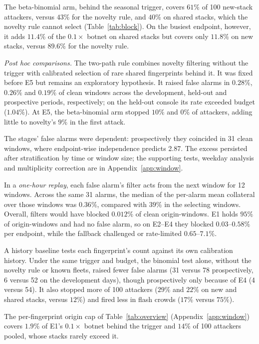 \documentclass[conference,letterpaper,10pt]{IEEEtran}
\newcommand\1{\textit{(i)}}
\newcommand\2{\textit{(ii)}}
\newcommand\3{\textit{(iii)}}
\newcommand\4{\textit{(iv)}}
\newcommand\5{\textit{(v)}}
\newcommand\6{\textit{(vi)}}
\newcommand\7{\textit{(vii)}}
\newcommand\8{\textit{(viii)}}
\newcommand\9{\textit{(ix)}}
\begin{document}
The beta-binomial arm, behind the seasonal trigger, covers $61\%$ of 100 new-stack attackers, versus $43\%$ for the novelty rule, and $40\%$ on shared stacks, which the novelty rule cannot select (Table~\ref{tab:block}). On the busiest endpoint, however, it adds $11.4\%$ of the $0.1\times$ botnet on shared stacks but covers only $11.8\%$ on new stacks, versus $89.6\%$ for the novelty rule.

\textit{Post hoc comparisons.} The two-path rule combines novelty filtering without the trigger with calibrated selection of rare shared fingerprints behind it. It was fixed before E5 but remains an exploratory hypothesis. It raised false alarms in $0.28\%$, $0.26\%$ and $0.19\%$ of clean windows across the development, held-out and prospective periods, respectively; on the held-out console its rate exceeded budget ($1.04\%$). At E5, the beta-binomial arm stopped $10\%$ and $0\%$ of attackers, adding little to novelty's $9\%$ in the first attack.

The stages' false alarms were dependent: prospectively they coincided in 31 clean windows, where endpoint-wise independence predicts 2.87. The excess persisted after stratification by time or window size; the supporting tests, weekday analysis and multiplicity correction are in Appendix~\ref{app:window}.

In a \textit{one-hour replay}, each false alarm's filter acts from the next window for 12 windows. Across the same 31 alarms, the median of the per-alarm mean collateral over those windows was $0.36\%$, compared with $39\%$ in the selecting windows. Overall, filters would have blocked $0.012\%$ of clean origin-windows. E1 holds $95\%$ of origin-windows and had no false alarm, so on E2--E4 they blocked $0.03$--$0.58\%$ per endpoint, while the fallback challenged or rate-limited $0.65$--$7.1\%$.

A history baseline tests each fingerprint's count against its own calibration history. Under the same trigger and budget, the binomial test alone, without the novelty rule or known fleets, raised fewer false alarms (31 versus 78 prospectively, 6 versus 52 on the development days), though prospectively only because of E4 (4 versus 54). It also stopped more of 100 attackers ($29\%$ and $22\%$ on new and shared stacks, versus $12\%$) and fired less in flash crowds ($17\%$ versus $75\%$).

The per-fingerprint origin cap of Table~\ref{tab:overview} (Appendix~\ref{app:window}) covers $1.9\%$ of E1's $0.1\times$ botnet behind the trigger and $14\%$ of 100 attackers pooled, whose stacks rarely exceed it.
\end{document}
